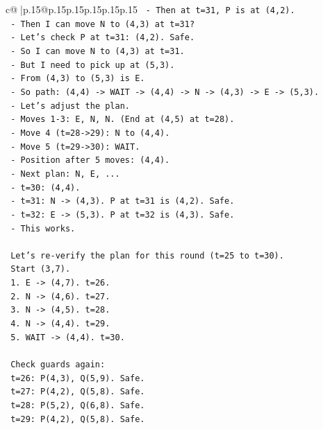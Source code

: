 \documentclass{article}
\begin{document}
{\begin{supertabular}{c@{$\;$}|p{.15\linewidth}@{}p{.15\linewidth}p{.15\linewidth}p{.15\linewidth}p{.15\linewidth}p{.15\linewidth}}
{{{\texttt{  {-} Then at t=31, P is at (4,2).} \\
\texttt{  {-} Then I can move N to (4,3) at t=31?} \\
\texttt{  {-} Let's check P at t=31: (4,2). Safe.} \\
\texttt{  {-} So I can move N to (4,3) at t=31.} \\
\texttt{  {-} But I need to pick up at (5,3).} \\
\texttt{  {-} From (4,3) to (5,3) is E.} \\
\texttt{  {-} So path: (4,4) {-}> WAIT {-}> (4,4) {-}> N {-}> (4,3) {-}> E {-}> (5,3).} \\
\texttt{  {-} Let's adjust the plan.} \\
\texttt{  {-} Moves 1{-}3: E, N, N. (End at (4,5) at t=28).} \\
\texttt{  {-} Move 4 (t=28{-}>29): N to (4,4).} \\
\texttt{  {-} Move 5 (t=29{-}>30): WAIT.} \\
\texttt{  {-} Position after 5 moves: (4,4).} \\
\texttt{  {-} Next plan: N, E, ...} \\
\texttt{  {-} t=30: (4,4).} \\
\texttt{  {-} t=31: N {-}> (4,3). P at t=31 is (4,2). Safe.} \\
\texttt{  {-} t=32: E {-}> (5,3). P at t=32 is (4,3). Safe.} \\
\texttt{  {-} This works.} \\
\\ 
\texttt{  Let's re{-}verify the plan for this round (t=25 to t=30).} \\
\texttt{  Start (3,7).} \\
\texttt{  1. E {-}> (4,7). t=26.} \\
\texttt{  2. N {-}> (4,6). t=27.} \\
\texttt{  3. N {-}> (4,5). t=28.} \\
\texttt{  4. N {-}> (4,4). t=29.} \\
\texttt{  5. WAIT {-}> (4,4). t=30.} \\
\\ 
\texttt{  Check guards again:} \\
\texttt{  t=26: P(4,3), Q(5,9). Safe.} \\
\texttt{  t=27: P(4,2), Q(5,8). Safe.} \\
\texttt{  t=28: P(5,2), Q(6,8). Safe.} \\
\texttt{  t=29: P(4,2), Q(5,8). Safe.} \\
}}}
\end{supertabular}}
\end{document}
